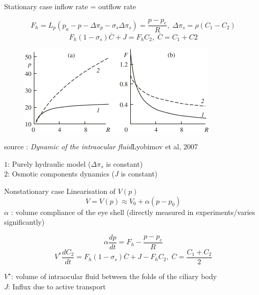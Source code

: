 \begin{frame}{Stationary case}
 inflow rate = outflow rate
\begin{block}{}
\[
F_h = L_p \left(p_a-p-\Delta \pi_p - \sigma_s \Delta\pi_s\right) = \frac{p - p_e}{R}, \; \Delta \pi_s = \rho(C_1-C_2)
\]
\[
F_h (1 - \sigma_s) \overline{C} + J = F_hC_2 , \; \overline{C}= C_1+C2
\]

\end{block}
\begin{figure}[H]
\includegraphics[scale=0.7]{images/courbes_pr_fr}
\end{figure}
\begin{center}
\tiny{source : \textit{Dynamic of the intraocular fluid}Lyobimov et al, 2007}
\end{center}
\small{$1$: Purely hydraulic model ($\Delta\pi_s$ is constant)\\
$2$: Osmotic components dynamics ($J$ is constant)}
\end{frame}


\begin{frame}{Nonstationary case}
Linearisation of $V(p)$
\[
V = V(p) \approx V_0 + \alpha (p-p_0)
\]
$\alpha$ : volume compliance of the eye shell (directly measured in experiments/varies significantly)

\begin{block}{}
\[
 \alpha \frac{dp}{dt}=F_{h}-\frac{p-p_e}{R}
 \]
\[
 V^{\ast} \frac{dC_{2}}{dt}= F_h(1-\sigma_s)\overline{C} + J - F_hC_2,\; \overline{C}= \frac{C_1+C_2}{2}
 \]
\end{block}

$V^\star$: volume of intraocular fluid between the folds of the ciliary body\\
$J$: Influx due to active transport

\end{frame}
